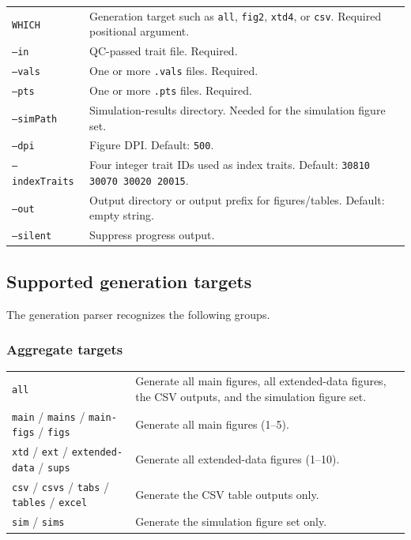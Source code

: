 \documentclass[11pt]{article}
\begin{document}
\begin{longtable}{p{3.2cm}p{10.8cm}}
\texttt{WHICH} & Generation target such as \texttt{all}, \texttt{fig2}, \texttt{xtd4}, or \texttt{csv}. Required positional argument. \\
\texttt{--in} & QC-passed trait file. Required. \\
\texttt{--vals} & One or more \texttt{.vals} files. Required. \\
\texttt{--pts} & One or more \texttt{.pts} files. Required. \\
\texttt{--simPath} & Simulation-results directory. Needed for the simulation figure set. \\
\texttt{--dpi} & Figure DPI. Default: \texttt{500}. \\
\texttt{--indexTraits} & Four integer trait IDs used as index traits. Default: \texttt{30810 30070 30020 20015}. \\
\texttt{--out} & Output directory or output prefix for figures/tables. Default: empty string. \\
\texttt{--silent} & Suppress progress output. \\
\end{longtable}

\subsection{Supported generation targets}

The generation parser recognizes the following groups.

\subsubsection*{Aggregate targets}

\begin{longtable}{p{3cm}p{11cm}}
\texttt{all} & Generate all main figures, all extended-data figures, the CSV outputs, and the simulation figure set. \\
\texttt{main} / \texttt{mains} / \texttt{main-figs} / \texttt{figs} & Generate all main figures (1--5). \\
\texttt{xtd} / \texttt{ext} / \texttt{extended-data} / \texttt{sups} & Generate all extended-data figures (1--10). \\
\texttt{csv} / \texttt{csvs} / \texttt{tabs} / \texttt{tables} / \texttt{excel} & Generate the CSV table outputs only. \\
\texttt{sim} / \texttt{sims} & Generate the simulation figure set only. \\
\end{longtable}
\end{document}
